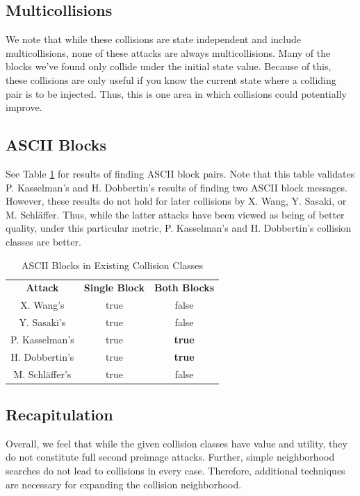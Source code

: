 \documentclass[conference]{IEEEtran}
\begin{document}
\subsection{Multicollisions}

We note that while these collisions are state independent and include
multicollisions, none of these attacks are always multicollisions. Many of the
blocks we've found only collide under the initial state value. Because of this,
these collisions are only useful if you know the current state where a
colliding pair is to be injected. Thus, this is one area in which collisions
could potentially improve.


\subsection{ASCII Blocks}

See Table \ref{table:ascii} for results of finding ASCII block pairs. Note that
this table validates P. Kasselman's and H. Dobbertin's results of finding
two ASCII block messages. However, these results do not hold for later
collisions by X. Wang, Y. Sasaki, or M. Schl{\"a}ffer. Thus, while the latter
attacks have been viewed as being of better quality, under this particular
metric, P. Kasselman's and H. Dobbertin's collision classes are better.

\begin{table}
    \caption{ASCII Blocks in Existing Collision Classes}
    \label{table:ascii}
    \begin{tabular}{c c c}
        \textbf{Attack} & \textbf{Single Block} & \textbf{Both Blocks} \\
        X. Wang's & true & false \\
        Y. Sasaki's & true & false \\
        P. Kasselman's & true & \textbf{true} \\
        H. Dobbertin's & true & \textbf{true} \\
        M. Schl{\"a}ffer's & true & false \\
    \end{tabular}
\end{table}


\subsection{Recapitulation}

Overall, we feel that while the given collision classes have value and utility,
they do not constitute full second preimage attacks. Further, simple
neighborhood searches do not lead to collisions in every case. Therefore,
additional techniques are necessary for expanding the collision neighborhood.
\end{document}
